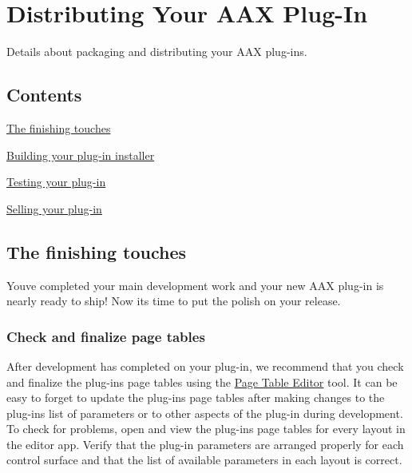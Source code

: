 \hypertarget{a00372}{}\section{Distributing Your A\+A\+X Plug-\/\+In}
\label{a00372}
Details about packaging and distributing your A\+A\+X plug-\/ins. 

\hypertarget{a00372_aax_distributing_contents}{}\subsection{Contents}\label{a00372_aax_distributing_contents}

\begin{DoxyItemize}
\item \hyperlink{a00372_aax_distributing_finishing}{The finishing touches}
\item \hyperlink{a00372_aax_distributing_installer}{Building your plug-\/in installer}
\item \hyperlink{a00372_aax_distributing_testing}{Testing your plug-\/in}
\item \hyperlink{a00372_aax_distributing_selling}{Selling your plug-\/in}
\end{DoxyItemize}

 \hypertarget{a00372_aax_distributing_finishing}{}\subsection{The finishing touches}\label{a00372_aax_distributing_finishing}
 You\textquotesingle{}ve completed your main development work and your new A\+A\+X plug-\/in is nearly ready to ship! Now it\textquotesingle{}s time to put the polish on your release.

\hypertarget{a00372_aax_distributing_finishing_pagetables}{}\subsubsection{Check and finalize page tables}\label{a00372_aax_distributing_finishing_pagetables}
 After development has completed on your plug-\/in, we recommend that you check and finalize the plug-\/in\textquotesingle{}s page tables using the \hyperlink{a00363_subsection_creating_page_tables_in_pete}{Page Table Editor} tool. It can be easy to forget to update the plug-\/in\textquotesingle{}s page tables after making changes to the plug-\/in\textquotesingle{}s list of parameters or to other aspects of the plug-\/in during development. To check for problems, open and view the plug-\/in\textquotesingle{}s page tables for every layout in the editor app. Verify that the plug-\/in parameters are arranged properly for each control surface and that the list of available parameters in each layout is correct.

